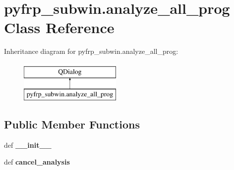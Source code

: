 \hypertarget{classpyfrp__subwin_1_1analyze__all__prog}{\section{pyfrp\+\_\+subwin.\+analyze\+\_\+all\+\_\+prog Class Reference}
\label{classpyfrp__subwin_1_1analyze__all__prog}
}
Inheritance diagram for pyfrp\+\_\+subwin.\+analyze\+\_\+all\+\_\+prog\+:\begin{figure}[H]
\begin{center}
\leavevmode
\includegraphics[height=2.000000cm]{classpyfrp__subwin_1_1analyze__all__prog}
\end{center}
\end{figure}
\subsection*{Public Member Functions}
\begin{DoxyCompactItemize}
\item 
\hypertarget{classpyfrp__subwin_1_1analyze__all__prog_a2e23b0e0d707d0d412ed59caa561a145}{def {\bfseries \+\_\+\+\_\+init\+\_\+\+\_\+}}\label{classpyfrp__subwin_1_1analyze__all__prog_a2e23b0e0d707d0d412ed59caa561a145}

\item 
\hypertarget{classpyfrp__subwin_1_1analyze__all__prog_ad7a7103733ac63306032980b27760c13}{def {\bfseries cancel\+\_\+analysis}}\label{classpyfrp__subwin_1_1analyze__all__prog_ad7a7103733ac63306032980b27760c13}

\end{DoxyCompactItemize}
